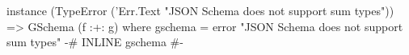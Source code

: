 \begin{code}
instance
  (TypeError ('Err.Text
      "JSON Schema does not support sum types"))
    => GSchema (f :+: g) where
  gschema =
    error
      "JSON Schema does not support sum types"
  {-# INLINE gschema #-}
\end{code}
